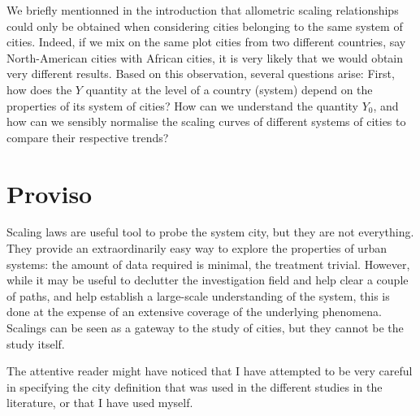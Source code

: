 We briefly mentionned in the introduction that allometric scaling relationships
could only be obtained when considering cities belonging to the same system of
cities. Indeed, if we mix on the same plot cities from two different countries,
say North-American cities with African cities, it is very likely that we would
obtain very different results. Based on this observation, several questions
arise: First, how does the $Y$ quantity at the level of a country (system)
depend on the properties of its system of cities? How can we understand the
quantity $Y_0$, and how can we sensibly normalise the scaling curves of
different systems of cities to compare their respective trends?

\section{Proviso}
\label{sec:poviso}

Scaling laws are useful tool to probe the system city, but they are not
everything. They provide an extraordinarily easy way to explore the properties
of urban systems: the amount of data required is minimal, the treatment
trivial. However, while it may be useful to declutter the investigation field
and help clear a couple of paths, and help establish a large-scale understanding
of the system, this is done at the expense of an extensive coverage of the
underlying phenomena. Scalings can be seen as a gateway to the study of cities,
but they cannot be the study itself.

The attentive reader might have noticed that I have attempted to be very careful
in specifying the city definition that was used in the different studies in the
literature, or that I have used myself.
